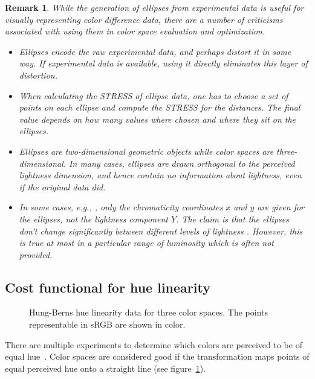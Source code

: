 \documentclass{scrartcl}
\newtheorem*{remark}{Remark}
\theoremstyle{named}
\begin{document}
\begin{remark}
  While the generation of ellipses from experimental data is useful for visually
  representing color difference data, there are a number of criticisms associated with
  using them in color space evaluation and optimization.
  \begin{itemize}
    \item Ellipses encode the raw experimental data, and perhaps distort it in some way.
      If experimental data is available, using it directly eliminates this layer of
      distortion.
    \item When calculating the STRESS of ellipse data, one has to choose a set of points
      on each ellipse and compute the STRESS for the distances. The final value depends
      on how many values where chosen and where they sit on the ellipses.
    \item Ellipses are two-dimensional geometric objects while color spaces are
      three-dimensional. In many cases, ellipses are drawn orthogonal to the perceived
      lightness dimension, and hence contain no information about lightness, even if the
      original data did.
    \item In some cases, e.g., \cite{macadam1942}, only the chromaticity coordinates $x$
      and $y$ are given for the ellipses, not the lightness component $Y$. The claim is
      that the ellipses don't change significantly between different levels of lightness
      \cite{brown}. However, this is true at most in a particular range of luminosity
      which is often not provided.
    \end{itemize}
\end{remark}


\subsection{Cost functional for hue linearity}

\begin{figure}
  \centering
  
  \hfill
  
  \hfill
  
  \caption{Hung-Berns \cite{hung} hue linearity data for three color spaces. The points
  representable in sRGB are shown in color.}
  \label{fig:hung}
\end{figure}

There are multiple experiments to determine which colors are perceived to be of equal
hue~\cite{hung,ebner,xiao}. Color spaces are considered good if the transformation maps
points of equal perceived hue onto a straight line (see figure~\ref{fig:hung}).
\end{document}

